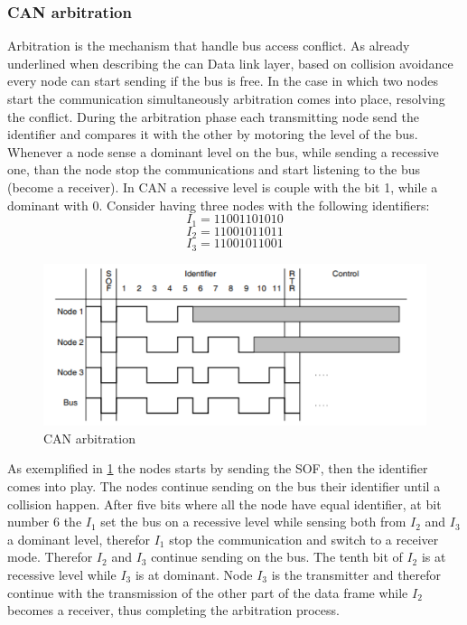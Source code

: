 \documentclass[../main.tex]{subfiles}
\begin{document}
\subsubsection{CAN arbitration}
Arbitration is the mechanism that handle \gls{bus} access conflict. As already underlined when describing the can Data link layer, based on collision avoidance every node can start sending if the \gls{bus} is free. In the case in which two nodes start the communication simultaneously arbitration comes into place, resolving the conflict. During the arbitration phase each transmitting node send the identifier and compares it with the other by motoring the level of the \gls{bus}. Whenever a node sense a dominant level on the bus, while sending a recessive one, than the node stop the communications and start listening to the \gls{bus} (become a receiver). In \gls{CAN} a recessive level is couple with the bit 1, while a dominant with 0. Consider having three nodes with the following identifiers:
\begin{equation}
I_{1} = 11001101010
\end{equation}
\begin{equation}
I_{2} = 11001011011
\end{equation}
\begin{equation}
I_{3} = 11001011001
\end{equation}
\begin{figure}[ht]
    \centering
    \includegraphics[width=\linewidth]{images_folder/can_arbitration.png}
    \caption{CAN arbitration}
    \label{fig:CANABR}
\end{figure}
As exemplified in \ref{fig:CANABR} the nodes starts by sending the \gls{SOF}, then the identifier comes into play. The nodes continue sending on the \gls{bus} their identifier until a collision happen. After five bits where all the node have equal identifier, at bit number 6 the $I_1$ set the bus on a recessive level while sensing both from $I_2$ and $I_3$ a dominant level, therefor $I_1$ stop the communication and switch to a receiver mode. Therefor $I_2$ and $I_3$ continue sending on the \gls{bus}. The tenth bit of $I_2$ is at recessive level while $I_3$ is at dominant. Node $I_3$ is the transmitter and therefor continue with the transmission of the other part of the data frame while $I_2$ becomes a receiver, thus completing the arbitration process.\\
\end{document}
